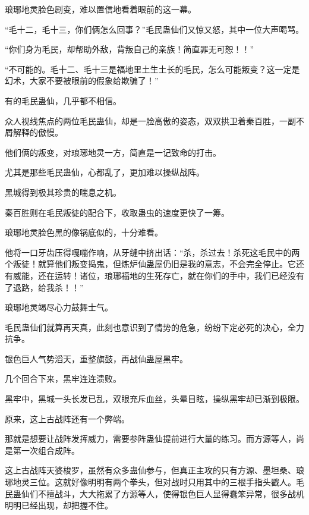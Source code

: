 
\begin{this_body}



琅琊地灵脸色剧变，难以置信地看着眼前的这一幕。

“毛十二，毛十三，你们俩怎么回事？”毛民蛊仙们又惊又怒，其中一位大声喝骂。

“你们身为毛民，却帮助外敌，背叛自己的亲族！简直罪无可恕！！”

“不可能的。毛十二、毛十三是福地里土生土长的毛民，怎么可能叛变？这一定是幻术，大家不要被眼前的假象给欺骗了！”

有的毛民蛊仙，几乎都不相信。

众人视线焦点的两位毛民蛊仙，却是一脸高傲的姿态，双双拱卫着秦百胜，一副不屑解释的傲慢。

他们俩的叛变，对琅琊地灵一方，简直是一记致命的打击。

尤其是那些毛民蛊仙，心都乱了，更加难以操纵战阵。

黑城得到极其珍贵的喘息之机。

秦百胜则在毛民叛徒的配合下，收取蛊虫的速度更快了一筹。

琅琊地灵脸色黑的像锅底似的，十分难看。

他将一口牙齿压得嘎嘣作响，从牙缝中挤出话：“杀，杀过去！杀死这毛民中的两个叛徒！就算他们叛变捣鬼，但炼炉仙蛊屋仍旧是我的意志，不会完全停止。它还有威能，还在运转！诸位，琅琊福地的生死存亡，就在你们的手中，我们已经没有了退路，给我杀！！”

琅琊地灵竭尽心力鼓舞士气。

毛民蛊仙们就算再天真，此刻也意识到了情势的危急，纷纷下定必死的决心，全力抗争。

银色巨人气势滔天，重整旗鼓，再战仙蛊屋黑牢。

几个回合下来，黑牢连连溃败。

黑牢中，黑城一头长发已乱，双眼充斥血丝，头晕目眩，操纵黑牢却已渐到极限。

原来，这上古战阵还有一个弊端。

那就是想要让战阵发挥威力，需要参阵蛊仙提前进行大量的练习。而方源等人，尚是第一次组合成阵。

这上古战阵天婆梭罗，虽然有众多蛊仙参与，但真正主攻的只有方源、墨坦桑、琅琊地灵三位。这就好像明明有两个拳头，但对战时只用其中的三根手指头戳人。毛民蛊仙们不擅战斗，大大拖累了方源等人，使得银色巨人显得蠢笨异常，很多战机明明已经出现，却把握不住。


\end{this_body}
